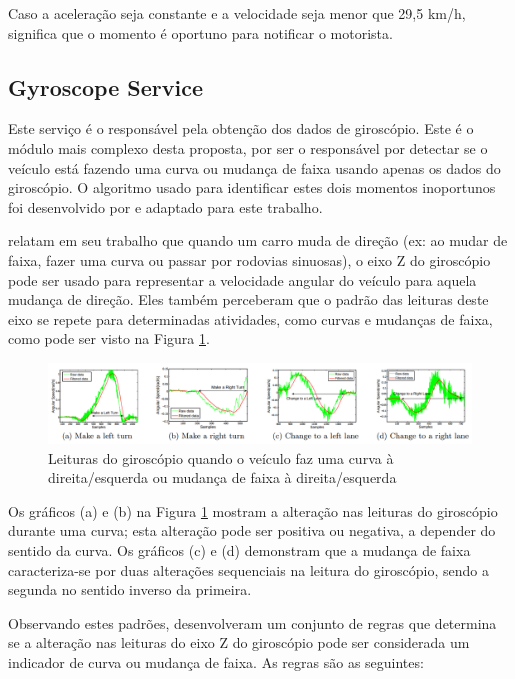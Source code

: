 Caso a aceleração seja constante e a velocidade seja menor que 29,5 km/h, significa que o momento é oportuno para notificar o motorista.

\subsection{Gyroscope Service}
\label{gyroscope-service}

Este serviço é o responsável pela obtenção dos dados de giroscópio. Este é o módulo mais complexo desta proposta, por ser o responsável por
detectar se o veículo está fazendo uma curva ou mudança de faixa usando apenas os dados do giroscópio. O algoritmo usado para identificar
estes dois momentos inoportunos foi desenvolvido por  e adaptado para este trabalho.

 relatam em seu trabalho que quando um carro muda de direção (ex: ao mudar de faixa, fazer uma curva ou passar
por rodovias sinuosas), o eixo Z do giroscópio pode ser usado para representar a velocidade angular do veículo para aquela mudança de direção.
Eles também perceberam que o padrão das leituras deste eixo se repete para determinadas atividades, como curvas e mudanças de faixa, como pode
ser visto na Figura \ref{leituras-giroscopio}.

\begin{figure}[h]
\centering
\includegraphics[width=1\textwidth]{images/leituras-giroscopio.png}
\caption{Leituras do giroscópio quando o veículo faz uma curva à direita/esquerda ou mudança de faixa à direita/esquerda \cite{chen2015invisible}}
\label{leituras-giroscopio}
\end{figure}

Os gráficos (a) e (b) na Figura \ref{leituras-giroscopio} mostram a alteração nas leituras do giroscópio durante uma curva; esta alteração pode ser positiva ou negativa,
a depender do sentido da curva. Os gráficos (c) e (d) demonstram que a mudança de faixa caracteriza-se por duas alterações sequenciais na leitura do giroscópio,
sendo a segunda no sentido inverso da primeira.

Observando estes padrões,  desenvolveram um conjunto de regras que determina se a alteração nas leituras do eixo Z do
giroscópio pode ser considerada um indicador de curva ou mudança de faixa. As regras são as seguintes:

